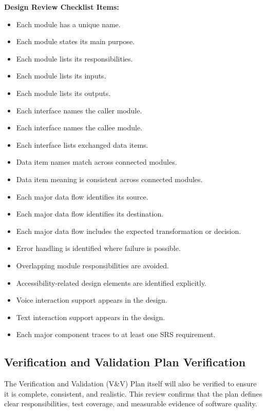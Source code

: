 \documentclass[12pt, titlepage]{article}
\begin{document}
\vspace{0.5em}
\noindent\textbf{Design Review Checklist Items:}
\begin{itemize}
\item Each module has a unique name.
\item Each module states its main purpose.
\item Each module lists its responsibilities.
\item Each module lists its inputs.
\item Each module lists its outputs.
\item Each interface names the caller module.
\item Each interface names the callee module.
\item Each interface lists exchanged data items.
\item Data item names match across connected modules.
\item Data item meaning is consistent across connected modules.
\item Each major data flow identifies its source.
\item Each major data flow identifies its destination.
\item Each major data flow includes the expected transformation or decision.
\item Error handling is identified where failure is possible.
\item Overlapping module responsibilities are avoided.
\item Accessibility-related design elements are identified explicitly.
\item Voice interaction support appears in the design.
\item Text interaction support appears in the design.
\item Each major component traces to at least one SRS requirement.
\end{itemize}

\subsection{Verification and Validation Plan Verification}

The Verification and Validation (V\&V) Plan itself will also be verified to
ensure it is complete, consistent, and realistic. This review confirms that
the plan defines clear responsibilities, test coverage, and measurable
evidence of software quality.
\end{document}
